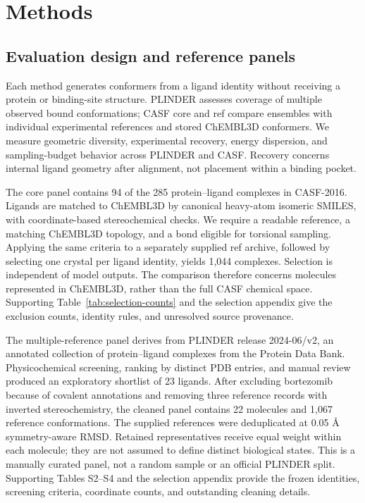 \section{Methods}
\label{sec:methods}

\subsection{Evaluation design and reference panels}

Each method generates conformers from a ligand identity without receiving a protein
or binding-site structure. PLINDER assesses coverage of multiple observed bound
conformations; CASF core and ref compare ensembles with individual experimental
references and stored ChEMBL3D\cite{nikitin2025loqi} conformers. We measure geometric
diversity, experimental recovery, energy dispersion, and sampling-budget behavior
across PLINDER and CASF. Recovery concerns internal ligand geometry after
alignment, not placement within a binding pocket.

The core panel contains 94 of the 285 protein--ligand complexes in
CASF-2016.\cite{su2019casf} Ligands are matched to ChEMBL3D by canonical heavy-atom
isomeric SMILES, with coordinate-based stereochemical checks. We require a readable
reference, a matching ChEMBL3D topology, and a bond eligible for torsional sampling.
Applying the same criteria to a separately supplied ref archive, followed by selecting
one crystal per ligand identity, yields 1,044 complexes. Selection is independent of
model outputs. The comparison therefore concerns molecules represented in ChEMBL3D,
rather than the full CASF chemical space. Supporting Table~\ref{tab:selection-counts}
and the selection appendix give the exclusion counts, identity rules, and unresolved
source provenance.

The multiple-reference panel derives from PLINDER release 2024-06/v2,\cite{durairaj2024plinder}
an annotated collection of protein--ligand complexes from the Protein Data Bank.
Physicochemical screening, ranking by distinct PDB entries, and manual review produced
an exploratory shortlist of 23 ligands. After excluding bortezomib because of covalent
annotations and removing three reference records with inverted stereochemistry, the
cleaned panel contains 22 molecules and 1,067 reference conformations. The supplied
references were deduplicated at 0.05 \AA{} symmetry-aware RMSD. Retained representatives
receive equal weight within each molecule; they are not assumed to define distinct
biological states. This is a manually curated panel, not a random sample or an official
PLINDER split. Supporting Tables S2--S4 and the selection appendix provide the frozen
identities, screening criteria, coordinate counts, and outstanding cleaning details.

